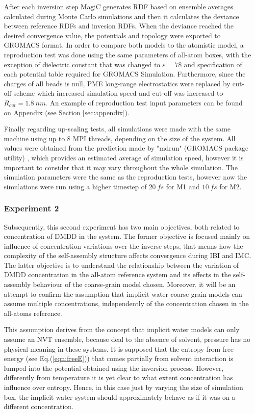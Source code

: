 \documentclass[10pt,a4paper,twoside]{article}
\begin{document}
 After each inversion step MagiC generates RDF based on ensemble averages calculated during Monte Carlo simulations and then it calculates the deviance between reference RDFs and invesion RDFs. When the deviance reached the desired convergence value, the potentials and topology were exported to GROMACS format. In order to compare both models to the atomistic model, a reproduction test was done using the same parameters of all-atom boxes, with the exception of dielectric constant that was changed to $\varepsilon = 78$ and specification of each potential table required for GROMACS Simulation. Furthermore, since the charges of all beads is null, PME long-range electrostatics were replaced by cut-off scheme which increased simulation speed and cut-off was increased to $R_{cut} = 1.8 \ nm$. An example of reproduction test input parameters can be found on Appendix (see Section \ref{sec:appendix}).
 
 Finally regarding up-scaling tests, all simulations were made with the same machine using up to 8 MPI threads, depending on the size of the system. All values were obtained from the prediction made by "mdrun" (GROMACS package utility) \cite{gromanual}, which provides an estimated average of simulation speed, however it is important to consider that it may vary throughout the whole simulation. The simulation parameters were the same as the reproduction tests, however now the simulations were run using a higher timestep of $20\ fs$ for M1 and $10\ fs$ for M2. 

\subsubsection*{Experiment 2}
 Subsequently, this second experiment has two main objectives, both related to concentration of DMDD in the system. The former objective is focused mainly on influence of concentration variations over the inverse steps, that means how the complexity of the self-assembly 
 structure affects convergence during IBI and IMC. The latter objective is to understand the relationship between the variation of DMDD concentration in the all-atom reference system and its effects in the self-assembly behaviour of the coarse-grain model chosen. Moreover, it will be an attempt to confirm the assumption that implicit water coarse-grain models can assume multiple concentrations, independently of the concentration chosen in the all-atoms reference.
 
 This assumption derives from the concept that implicit water models can only assume an NVT ensemble, because deal to the absence of solvent, pressure has no physical meaning in these systems. It is supposed that the entropy from free energy (see Eq.(\ref{eqn:freeE})) that comes partially from solvent interaction is lumped into the potential obtained using the inversion process. However,   differently from temperature it is yet clear to what extent concentration has influence over entropy. Hence, in this case just by varying the size of simulation box, the implicit water system should approximately behave as if it was on a different concentration.
  
\end{document}
